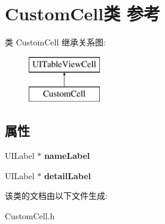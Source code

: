 \hypertarget{interface_custom_cell}{\section{Custom\-Cell类 参考}
\label{interface_custom_cell}
}
类 Custom\-Cell 继承关系图\-:\begin{figure}[H]
\begin{center}
\leavevmode
\includegraphics[height=2.000000cm]{interface_custom_cell}
\end{center}
\end{figure}
\subsection*{属性}
\begin{DoxyCompactItemize}
\item 
\hypertarget{interface_custom_cell_ae2248aa203b96fb217f19d6025616baa}{U\-I\-Label $\ast$ {\bfseries name\-Label}}\label{interface_custom_cell_ae2248aa203b96fb217f19d6025616baa}

\item 
\hypertarget{interface_custom_cell_a99a4e25f14b99e2b0f2d6349f37f94b7}{U\-I\-Label $\ast$ {\bfseries detail\-Label}}\label{interface_custom_cell_a99a4e25f14b99e2b0f2d6349f37f94b7}

\end{DoxyCompactItemize}


该类的文档由以下文件生成\-:\begin{DoxyCompactItemize}
\item 
Custom\-Cell.\-h\end{DoxyCompactItemize}
